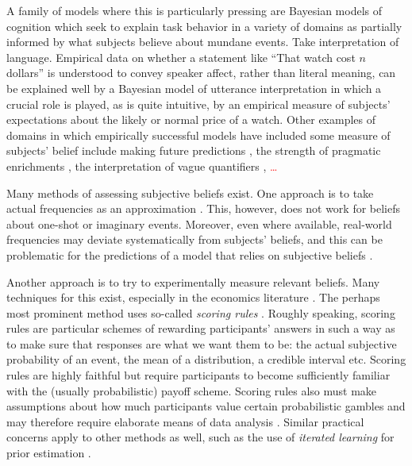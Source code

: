\documentclass[10pt,letterpaper]{article}
\newcommand{\citep}[1]{\cite{#1}}
\begin{document}
A family of models where this is particularly pressing are Bayesian models of cognition which
seek to explain task behavior in a variety of domains as partially informed by what subjects
believe about mundane events. Take interpretation of language. Empirical data on whether a
statement like ``That watch cost $n$ dollars'' is understood to convey speaker affect, rather
than literal meaning, can be explained well by a Bayesian model of utterance interpretation
\citep{KaoWu2014:Nonliteral-Unde} in which a crucial role is played, as is quite intuitive, by
an empirical measure of subjects' expectations about the likely or normal price of a
watch. Other examples of domains in which empirically successful models have included some
measure of subjects' belief include making future predictions
\citep{GriffithsTenenbaum2006:Optimal-Predict}, the strength of pragmatic enrichments
\citep{DegenTessler2015:Wonky-worlds:-L}, the interpretation of vague quantifiers
\citep{SchollerFranke2015:Semantic-values}, \textcolor{red}{ \dots }


Many methods of assessing subjective beliefs exist. One approach is to take actual frequencies
as an approximation \citep{GriffithsTenenbaum2006:Optimal-Predict}. This, however, does not
work for beliefs about one-shot or imaginary events. Moreover, even where available, real-world
frequencies may deviate systematically from subjects' beliefs, and this can be problematic for
the predictions of a model that relies on subjective beliefs
\citep{MarcusDavis2013:How-Robust-Are-}.

Another approach is to try to experimentally measure relevant beliefs. Many techniques for this
exist, especially in the economics literature
\citep{MorganHenrion1990:Uncertainty:-A-,Manski2004:Measuring-Expec,SchlagTremewan2014:A-penny-for-you,AndersenFountain2014:Estimating-Subj}. The
perhaps most prominent method uses so-called \emph{scoring rules}
\citep{Savage1971:Elicitation-of-,SchlagTremewan2014:A-penny-for-you}. Roughly speaking,
scoring rules are particular schemes of rewarding participants' answers in such a way as to
make sure that responses are what we want them to be: the actual subjective probability of an
event, the mean of a distribution, a credible interval etc. Scoring rules are highly faithful
but require participants to become sufficiently familiar with the (usually probabilistic)
payoff scheme. Scoring rules also must make assumptions about how much participants value
certain probabilistic gambles and may therefore require elaborate means of data analysis
\citep{AndersenFountain2014:Estimating-Subj}. Similar practical concerns apply to other methods
as well, such as the use of \emph{iterated learning} for prior estimation
\citep{LewandowskyGriffiths2009:The-Wisdom-of-I}.
\end{document}
